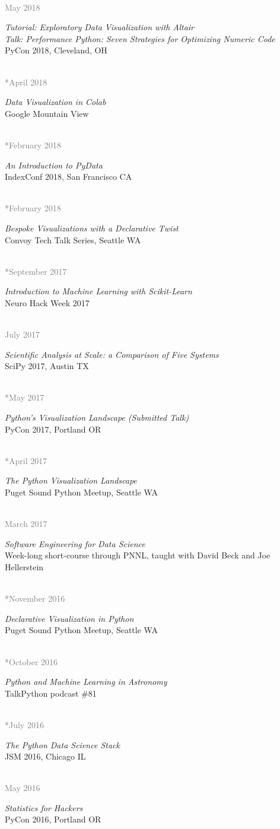 \documentclass{article} %
\newlength\sidebarwidth
\newcommand{\dateonly}[2][]
	 {\begin{minipage}{\textwidth}
	 \vspace*{.4\baselineskip}
         \nopagebreak\hspace{0in}%
         \nopagebreak\begin{minipage}[t]{\sidebarwidth - .2cm}
         \raggedleft {~}
         {\\[-\baselineskip] \textcolor{gray}{\footnotesize #1}}
	 \end{minipage}%
	 \hfill
	 \begin{minipage}[t]{\linewidth - \sidebarwidth}
	 #2%
	 \end{minipage}%
	 \vspace*{.2\baselineskip plus 1\baselineskip minus
	 .2\baselineskip}%
	 \end{minipage}}
\begin{document}
  \dateonly[May 2018]{
    {\it Tutorial: Exploratory Data Visualization with Altair}\\
    {\it Talk: Performance Python: Seven Strategies for Optimizing Numeric Code}\\
    PyCon 2018, Cleveland, OH
  }

  \dateonly[**April 2018]{
    {\it Data Visualization in Colab}\\
    Google Mountain View
  }

  \dateonly[**February 2018]{
    {\it An Introduction to PyData}\\
    IndexConf 2018, San Francisco CA
  }

  \dateonly[**February 2018]{
    {\it Bespoke Visualizations with a Declarative Twist}\\
    Convoy Tech Talk Series, Seattle WA
  }

  \dateonly[**September 2017]{
    {\it Introduction to Machine Learning with Scikit-Learn}\\
    Neuro Hack Week 2017
  }

  \dateonly[July 2017]{
     {\it Scientific Analysis at Scale: a Comparison of Five Systems}\\
     SciPy 2017, Austin TX
  }

  \dateonly[**May 2017]{
     {\it Python's Visualization Landscape (Submitted Talk)}\\
     PyCon 2017, Portland OR
  }

  \dateonly[**April 2017]{
     {\it The Python Visualization Landscape}\\
     Puget Sound Python Meetup, Seattle WA
  }

  \dateonly[March 2017]{
    {\it Software Engineering for Data Science}\\
    Week-long short-course through PNNL, taught with David Beck and Joe Hellerstein
  }

  \dateonly[**November 2016]{
     {\it Declarative Visualization in Python}\\
     Puget Sound Python Meetup, Seattle WA
  }

  \dateonly[**October 2016]{
     {\it Python and Machine Learning in Astronomy}\\
     TalkPython podcast \#81
  }

  \dateonly[**July 2016]{
      {\it The Python Data Science Stack}\\
      JSM 2016, Chicago IL
  }

  \dateonly[May 2016]{
      {\it Statistics for Hackers}\\
      PyCon 2016, Portland OR
  }
\end{document}
